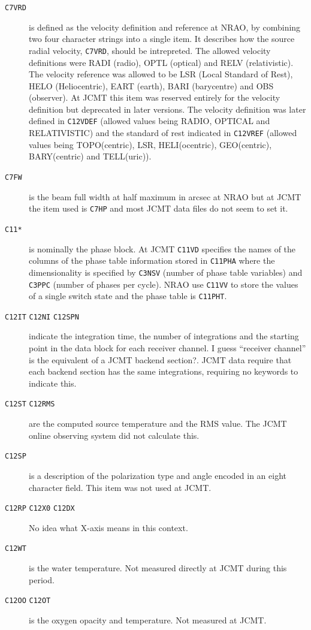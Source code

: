 \documentclass[final,authoryear,5p,times,twocolumn]{elsarticle}
\begin{document}
\begin{description}
\item[\texttt{C7VRD}] is defined as the velocity definition and
  reference at NRAO, by combining two four character strings into a
  single item. It describes how the source radial velocity,
  \texttt{C7VRD}, should be intrepreted. The allowed velocity
  definitions were RADI (radio), OPTL (optical) and RELV
  (relativistic). The velocity reference was allowed to be LSR (Local
  Standard of Rest), HELO (Heliocentric), EART (earth), BARI
  (barycentre) and OBS (observer). At JCMT this item was reserved
  entirely for the velocity definition but deprecated in later
  versions. The velocity definition was later defined in
  \texttt{C12VDEF} (allowed values being RADIO, OPTICAL and
  RELATIVISTIC) and the standard of rest indicated in \texttt{C12VREF}
  (allowed values being TOPO(centric), LSR, HELI(ocentric),
  GEO(centric), BARY(centric) and TELL(uric)).

\item[\texttt{C7FW}] is the beam full width at half maximum in arcsec
  at NRAO but at JCMT the item used is \texttt{C7HP} and most JCMT data
  files do not seem to set it.

\item[\texttt{C11*}] is nominally the phase block. At JCMT
  \texttt{C11VD} specifies the names of the columns of the phase table
  information stored in \texttt{C11PHA} where the dimensionality is
  specified by \texttt{C3NSV} (number of phase table variables) and
  \texttt{C3PPC} (number of phases per cycle). NRAO use \texttt{C11VV}
  to store the values of a single switch state and the phase table is
  \texttt{C11PHT}.

\item[\texttt{C12IT} \texttt{C12NI} \texttt{C12SPN}] indicate the integration time,
  the number of integrations and the starting point in the data block
  for each receiver channel. {\color{red} I guess ``receiver channel''
    is the equivalent of a JCMT backend section?}. JCMT data require
  that each backend section has the same integrations, requiring no
  keywords to indicate this.

\item[\texttt{C12ST} \texttt{C12RMS}] are the computed source
  temperature and the RMS value. The JCMT online observing system did
  not calculate this.

\item[\texttt{C12SP}] is a description of the polarization type and
  angle encoded in an eight character field. This item was not used at
  JCMT.

\item[\texttt{C12RP} \texttt{C12X0} \texttt{C12DX}] {\color{red} No
    idea what X-axis means in this context.}

\item[\texttt{C12WT}] is the water temperature. Not measured directly
  at JCMT during this period.

\item[\texttt{C12OO} \texttt{C12OT}] is the oxygen opacity and
  temperature. Not measured at JCMT.

\end{description}
\end{document}
